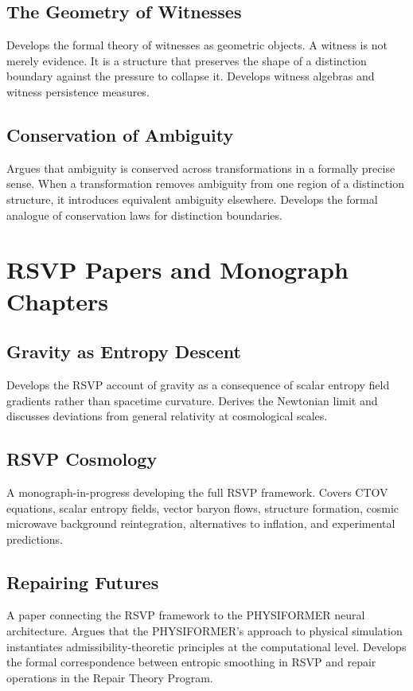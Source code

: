 \documentclass[12pt, openany]{book}
\begin{document}
\subsection{The Geometry of Witnesses} Develops the formal theory of
witnesses as geometric objects. A witness is not merely evidence. It is
a structure that preserves the shape of a distinction boundary against
the pressure to collapse it. Develops witness algebras and witness
persistence measures.

\subsection{Conservation of Ambiguity} Argues that ambiguity is conserved
across transformations in a formally precise sense. When a transformation
removes ambiguity from one region of a distinction structure, it introduces
equivalent ambiguity elsewhere. Develops the formal analogue of conservation
laws for distinction boundaries.

\section{RSVP Papers and Monograph Chapters}

\subsection{Gravity as Entropy Descent} Develops the RSVP account of
gravity as a consequence of scalar entropy field gradients rather than
spacetime curvature. Derives the Newtonian limit and discusses deviations
from general relativity at cosmological scales.

\subsection{RSVP Cosmology} A monograph-in-progress developing the full
RSVP framework. Covers CTOV equations, scalar entropy fields, vector baryon
flows, structure formation, cosmic microwave background reintegration,
alternatives to inflation, and experimental predictions.

\subsection{Repairing Futures} A paper connecting the RSVP framework to
the PHYSIFORMER neural architecture. Argues that the PHYSIFORMER's
approach to physical simulation instantiates admissibility-theoretic
principles at the computational level. Develops the formal correspondence
between entropic smoothing in RSVP and repair operations in the Repair
Theory Program.
\end{document}
